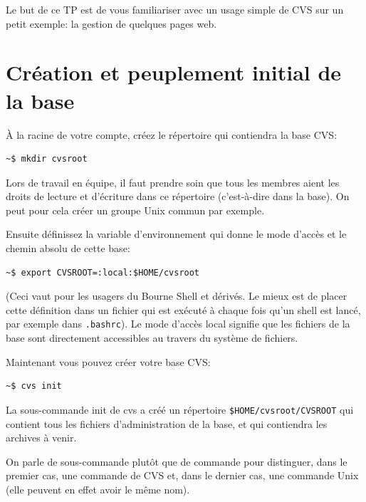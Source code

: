 \documentclass[11pt,a4paper]{article}
\begin{document}
Le but de ce TP est de vous familiariser avec un usage simple de CVS
sur un petit exemple: la gestion de quelques pages web.


\section{Création et peuplement initial de la base}

À la racine de votre compte, créez le répertoire qui contiendra la
base CVS:

{\small
\begin{verbatim}
~$ mkdir cvsroot
\end{verbatim}
}

\noindent Lors de travail en équipe, il faut prendre soin que tous les
membres aient les droits de lecture et d'écriture dans ce répertoire
(c'est-à-dire dans la base). On peut pour cela créer un groupe Unix
commun par exemple.

\bigskip

\noindent Ensuite définissez la variable d'environnement qui donne le
mode d'accès et le chemin absolu de cette base:

{\small
\begin{verbatim}
~$ export CVSROOT=:local:$HOME/cvsroot
\end{verbatim}
}

\noindent
(Ceci vaut pour les usagers du Bourne Shell et dérivés. Le mieux est
de placer cette définition dans un fichier qui est exécuté à chaque
fois qu'un shell est lancé, par exemple dans \texttt{.bashrc}). Le
mode d'accès \textsf{local} signifie que les fichiers de la base sont
directement accessibles au travers du système de fichiers.

\bigskip

\noindent Maintenant vous pouvez créer votre base CVS:

{\small
\begin{verbatim}
~$ cvs init
\end{verbatim}
}

\noindent La sous-commande \textsf{init} de cvs a créé un répertoire
\verb|$HOME/cvsroot/CVSROOT| qui contient tous les fichiers
d'administration de la base, et qui contiendra les archives à venir.

\bigskip

On parle de sous-commande plutôt que de commande pour distinguer, dans
le premier cas, une commande de CVS et, dans le dernier cas, une
commande Unix (elle peuvent en effet avoir le même nom).
\end{document}
